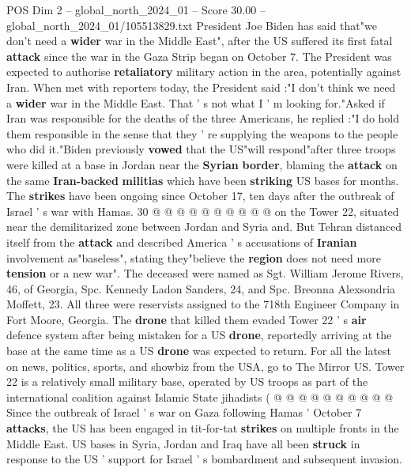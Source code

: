 \begin{textsample}{POS Dim 2 – global\_north\_2024\_01 – Score 30.00 – global\_north\_2024\_01/105513829.txt}  \label{ex:f2_pos_102}
President Joe Biden has said that"we don't need a \textbf{wider} war in the Middle East", after the US suffered its first fatal \textbf{attack} since the war in the Gaza Strip began on October 7.
The President was expected to authorise \textbf{retaliatory} military action in the area, potentially against Iran.
When met with reporters today, the President said :"I don't think we need a \textbf{wider} war in the Middle East.
That ' s not what I ' m looking for."Asked if Iran was responsible for the deaths of the three Americans, he replied :"I do hold them responsible in the sense that they ' re supplying the weapons to the people who did it."Biden previously \textbf{vowed} that the US"will respond"after three troops were killed at a base in Jordan near the \textbf{Syrian} \textbf{border}, blaming the \textbf{attack} on the same \textbf{Iran-backed} \textbf{militias} which have been \textbf{striking} US bases for months.
The \textbf{strikes} have been ongoing since October 17, ten days after the outbreak of Israel ' s war with Hamas. 30 @ @ @ @ @ @ @ @ @ @ on the Tower 22, situated near the demilitarized zone between Jordan and Syria and.
But Tehran distanced itself from the \textbf{attack} and described America ' s accusations of \textbf{Iranian} involvement as"baseless", stating they"believe the \textbf{region} does not need more \textbf{tension} or a new war".
The deceased were named as Sgt.
William Jerome Rivers, 46, of Georgia, Spc.
Kennedy Ladon Sanders, 24, and Spc.
Breonna Alexsondria Moffett, 23.
All three were reservists assigned to the 718th Engineer Company in Fort Moore, Georgia.
The \textbf{drone} that killed them evaded Tower 22 ' s \textbf{air} defence system after being mistaken for a US \textbf{drone}, reportedly arriving at the base at the same time as a US \textbf{drone} was expected to return.
For all the latest on news, politics, sports, and showbiz from the USA, go to The Mirror US.
Tower 22 is a relatively small military base, operated by US troops as part of the international coalition against Islamic State jihadists ( @ @ @ @ @ @ @ @ @ @ Since the outbreak of Israel ' s war on Gaza following Hamas ' October 7 \textbf{attacks}, the US has been engaged in tit-for-tat \textbf{strikes} on multiple fronts in the Middle East.
US bases in Syria, Jordan and Iraq have all been \textbf{struck} in response to the US ' support for Israel ' s bombardment and subsequent invasion.

\end{textsample}
